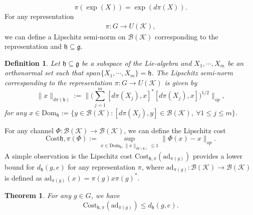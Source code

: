\documentclass[11pt,reqno]{amsart}
\numberwithin{equation}{section}
\newtheorem{theorem}[lemma]{Theorem}
\newtheorem{definition}[lemma]{Definition}
\newcommand{\mc}{\mathcal}
\newcommand{\adm}{\text{ad}}
\newcommand{\Cost}{\mathrm{Cost}}
\begin{document}
$$
\pi(\exp(X)) = \exp(d\pi(X)).
$$
For any representation \begin{align*}
\pi: G \to U(\mc K),
\end{align*}
we can define a Lipschitz semi-norm on $\mc B(\mc K)$ corresponding to the representation and $\mathfrak{h} \subseteq \mathfrak{g}$.
\begin{definition}\label{Lip norm: representation}
Let $\mathfrak{h} \subseteq \mathfrak{g}$ be a subspace of the Lie-algebra and $X_1,\cdots, X_m$ be an orthonormal set such that $span\{X_1,\cdots, X_m\} = \mathfrak{h}$. The Lipschitz semi-norm corresponding to the representation $\pi: G \to U(\mc K)$ is given by 
\begin{equation}
\|x\|_{d\pi(\mathfrak{h})}:= \|\big(\sum_{j=1}^m [d\pi(X_j), x]^*[d\pi(X_j), x]\big)^{1/2}\|_{op},
\end{equation}
for any $x\in \text{Dom}_\mathfrak{h}:= \{y\in \mc B(\mc K): [d\pi(X_j), y]\in \mc B(\mc K),\ \forall 1\le j\le m\}$.
\end{definition}
For any channel $\Phi: \mc B(\mc K) \to \mc B(\mc K)$, we can define the Lipschitz cost 
\begin{equation}
\Cost{\mathfrak{h},\pi}(\Phi):= \sup_{x \in \text{Dom}_\mathfrak{h}, \|x\|_{d\pi(\mathfrak{h})} \le 1} \|\Phi(x) - x\|_{op}. 
\end{equation}
A simple observation is the Lipschitz cost $\Cost_{\mathfrak{h},\pi}(\adm_{\pi(g)})$ provides a lower bound for $d_\mathfrak{h}(g,e)$ for any representation $\pi$, where $\adm_{\pi(g)}: \mc B(\mc K) \to \mc B(\mc K)$ is defined as $\adm_{\pi(g)}(x) = \pi(g) x \pi(g)^*$. 
\begin{theorem}\label{main:CC distance lower bound}
For any $g \in G$, we have 
\begin{equation}
\Cost_{\mathfrak{h},\pi}(\adm_{\pi(g)}) \le d_\mathfrak{h}(g,e).
\end{equation}
\end{theorem}
\end{document}
